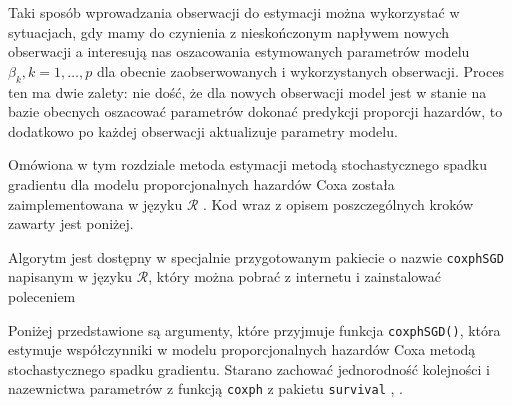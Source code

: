 Taki sposób wprowadzania obserwacji do estymacji można wykorzystać w sytuacjach, gdy mamy do czynienia z nieskończonym napływem nowych obserwacji a interesują nas oszacowania estymowanych parametrów modelu $\beta_k, k=1,\dots,p$ dla obecnie zaobserwowanych i wykorzystanych obserwacji. Proces ten ma dwie zalety: nie dość, że dla nowych obserwacji model jest w stanie na bazie obecnych oszacować parametrów dokonać predykcji proporcji hazardów, to dodatkowo po każdej obserwacji aktualizuje parametry modelu.

Omówiona w tym rozdziale metoda estymacji metodą stochastycznego spadku gradientu dla modelu proporcjonalnych hazardów Coxa została zaimplementowana w języku $\mathcal{R}$ \cite{programikr}. Kod wraz z opisem poszczególnych kroków zawarty jest poniżej.

\newpage
Algorytm jest dostępny w specjalnie przygotowanym pakiecie o nazwie
\texttt{coxphSGD} napisanym w języku \(\mathcal{R}\), który można pobrać
z internetu i zainstalować poleceniem

\begin{Shaded}
\begin{Highlighting}[]
\NormalTok{(}\NormalTok{) <}\StringTok{ }\NormalTok{) \{}
  \NormalTok{(}\NormalTok{)}
\NormalTok{\}}
\NormalTok{(}\NormalTok{)}
\end{Highlighting}
\end{Shaded}

Poniżej przedstawione są argumenty, które przyjmuje funkcja
\texttt{coxphSGD()}, która estymuje współczynniki w modelu
proporcjonalnych hazardów Coxa metodą stochastycznego spadku gradientu.
Starano zachować jednorodność kolejności i nazewnictwa parametrów z
funkcją \texttt{coxph} z pakietu \texttt{survival} \cite{ther},
\cite{survival}.

